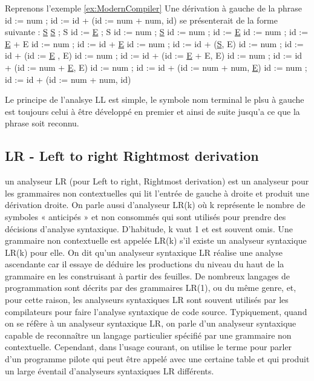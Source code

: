 \documentclass{article}
\begin{document}
Reprenons l'exemple \ref{ex:ModernCompiler} \newline
Une dérivation à gauche de la phrase id := num ; id := id + (id := num + num, id) se présenterait de la forme suivante :\newline\newline
\underline{S}\newline
\underline{S} ; S\newline
id := \underline{E} ; S\newline
id := num ; \underline{S}\newline
id := num ; id := \underline{E}\newline
id := num ; id := \underline{E} + E\newline
id := num ; id := id + \underline{E}\newline
id := num ; id := id + (\underline{S}, E)\newline
id := num ; id := id + (id := \underline{E} , E)\newline
id := num ; id := id + (id := \underline{E} + E, E)\newline
id := num ; id := id + (id := num + \underline{E}, E)\newline
id := num ; id := id + (id := num + num, \underline{E})\newline
id := num ; id := id + (id := num + num, id)\newline

Le principe de l'analsye LL est simple, le symbole nom terminal le plsu à gauche est toujours celui à être développé en premier et ainsi de suite jusqu'a ce que la phrase soit reconnu. 

\subsection{LR - Left to right Rightmost derivation}\label{sec:LR}

un analyseur LR (pour Left to right, Rightmost derivation) \cite{LR} est un analyseur pour les grammaires non contextuelles qui lit l'entrée de gauche à droite et produit une dérivation droite. On parle aussi d'analyseur LR(k) où k représente le nombre de symboles « anticipés » et non consommés qui sont utilisés pour prendre des décisions d'analyse syntaxique. D'habitude, k vaut 1 et est souvent omis. Une grammaire non contextuelle est appelée LR(k) s'il existe un analyseur syntaxique LR(k) pour elle.
On dit qu'un analyseur syntaxique LR réalise une analyse ascendante car il essaye de déduire les productions du niveau du haut de la grammaire en les construisant à partir des feuilles.
De nombreux langages de programmation sont décrits par des grammaires LR(1), ou du même genre, et, pour cette raison, les analyseurs syntaxiques LR sont souvent utilisés par les compilateurs pour faire l'analyse syntaxique de code source.
Typiquement, quand on se réfère à un analyseur syntaxique LR, on parle d'un analyseur syntaxique capable de reconnaître un langage particulier spécifié par une grammaire non contextuelle. Cependant, dans l'usage courant, on utilise le terme pour parler d'un programme pilote qui peut être appelé avec une certaine table et qui produit un large éventail d'analyseurs syntaxiques LR différents.
\end{document}
